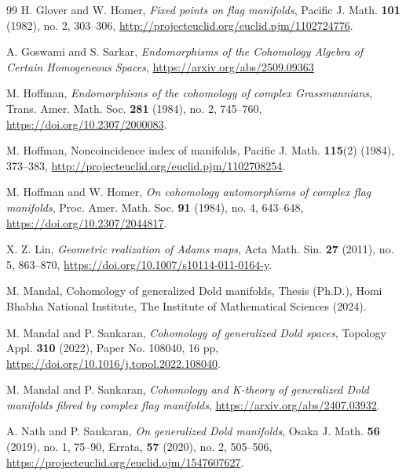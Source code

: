 \documentclass{amsart}
\begin{document}
\begin{thebibliography}{99}
 H. Glover and W. Homer, \textit{Fixed points on flag manifolds}, Pacific J. Math. \textbf{101} (1982), no. 2, 303--306, \url{http://projecteuclid.org/euclid.pjm/1102724776}.
	
 A. Goswami and S. Sarkar, \textit{Endomorphisms of the Cohomology Algebra of Certain Homogeneous Spaces}, \url{https://arxiv.org/abs/2509.09363}

 M. Hoffman, \textit{Endomorphisms of the cohomology of complex Grassmannians}, Trans. Amer. Math. Soc. \textbf{281} (1984), no. 2, 745--760, \url{https://doi.org/10.2307/2000083}.

 M. Hoffman, Noncoincidence index of manifolds, Pacific J. Math. \textbf{115}(2) (1984), 373--383, \url{http://projecteuclid.org/euclid.pjm/1102708254}.

 M. Hoffman and W. Homer, \textit{On cohomology automorphisms of complex flag manifolds}, Proc. Amer. Math. Soc. \textbf{91} (1984), no. 4, 643--648, \url{https://doi.org/10.2307/2044817}.

    
 X. Z. Lin, \textit{Geometric realization of Adams maps}, Acta Math. Sin. \textbf{27} (2011), no. 5, 863--870, \url{https://doi.org/10.1007/s10114-011-0164-y}.

 M. Mandal, Cohomology of generalized Dold manifolds, Thesis (Ph.D.), Homi Bhabha National Institute, The Institute of Mathematical Sciences (2024).
	
 M. Mandal and P. Sankaran, \textit{Cohomology of generalized Dold spaces}, Topology Appl. \textbf{310} (2022), Paper No. 108040, 16 pp, \url{https://doi.org/10.1016/j.topol.2022.108040}.
    
 M. Mandal and P. Sankaran, \textit{Cohomology and K-theory of generalized Dold manifolds fibred by complex flag manifolds}, \url{https://arxiv.org/abs/2407.03932}.
	
 A. Nath and P. Sankaran, \textit{On generalized Dold manifolds}, Osaka J. Math. \textbf{56} (2019), no. 1, 75--90, Errata, \textbf{57} (2020), no. 2, 505--506, %
\url{https://projecteuclid.org/euclid.ojm/1547607627}.
	

\end{thebibliography}
\end{document}
